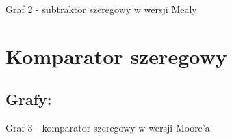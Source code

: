 \documentclass[12pt,a4paper]{article}
\begin{document}
			
			\begin{center}
				Graf 2 - subtraktor szeregowy w wersji Mealy
			\end{center}
		
		\FloatBarrier
		\restoregeometry
		
	\section{Komparator szeregowy}
	
		\subsection{Grafy:}
		
			\vspace{1.5cm}
			\begin{center}
				Graf 3 - komparator szeregowy w wersji Moore'a
			\end{center}
			
\end{document}

